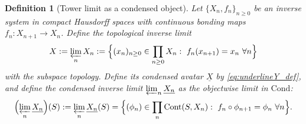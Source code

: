 \documentclass[11pt]{article}
\newtheorem{definition}[theorem]{Definition}
\theoremstyle{remark}
\begin{document}
{\begin{definition}[Tower limit as a condensed object]\label{def:tower_limit_condensed}
Let $\{X_n,f_n\}_{n\ge 0}$ be an inverse system in compact Hausdorff spaces with continuous bonding maps $f_n:X_{n+1}\to X_n$. Define the topological inverse limit
\begin{equation}\label{eq:X_limit_top}
X:=\varprojlim_{n} X_n:=\Bigl\{(x_n)_{n\ge 0}\in \prod_{n\ge 0}X_n:\ f_n(x_{n+1})=x_n\ \forall n\Bigr\}
\end{equation}
with the subspace topology. Define its condensed avatar $\underline{X}$ by \eqref{eq:underlineY_def}, and define the condensed inverse limit $\varprojlim_n \underline{X_n}$ as the objectwise limit in $\mathrm{Cond}$:
\begin{equation}\label{eq:condensed_limit_objectwise}
\Bigl(\varprojlim_n \underline{X_n}\Bigr)(S):=\varprojlim_n \underline{X_n}(S)=\Bigl\{(\phi_n)\in \prod_n \mathrm{Cont}(S,X_n):\ f_n\circ \phi_{n+1}=\phi_n\ \forall n\Bigr\}.
\end{equation}
\end{definition}

}
\end{document}
